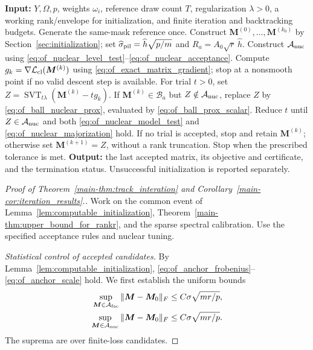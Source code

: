 \documentclass[numsec,webpdf,modern,large,namedate]{oup-authoring-template}
\theoremstyle{plain}
\theoremstyle{remark}
\newcommand{\M}{\bm{M}}
\newif\ifmarkchanges
\newenvironment{revision}{\begingroup\ifmarkchanges\color{red}\fi}{\endgroup}
\DeclareRobustCommand{\revisionfloatcolor}{\ifmarkchanges\color{red}\fi}
\begin{document}
\begin{revision}
\begin{algorithm}[!ht]\revisionfloatcolor{}
\caption{Nuclear-norm regularized residual spectral matching}
\label{alg:of_nuclear}
\begin{algorithmic}[1]
\State \textbf{Input:} $Y,\Omega,p$, weights $\omega_i$, reference draw count $T$,
regularization $\lambda>0$, a working rank/envelope for initialization, and
finite iteration and backtracking budgets.
\State Generate the same-mask reference once. Construct
$\M^{(0)},\ldots,\M^{(k_0)}$ by Section~\ref{sec:initialization}; set
$\widehat\sigma_{\rm pil}=\widehat h\sqrt{p/m}$ and
$R_a=A_0\sqrt r\,\widehat h$.
\State Construct $\mathcal A_{\rm nuc}$ using
\eqref{eq:of_nuclear_level_test}--\eqref{eq:of_nuclear_acceptance}.
\State Compute $g_k=\nabla\mathcal L_{\rm cl}(\M^{(k)})$ using \eqref{eq:of_exact_matrix_gradient}; stop at a nonsmooth point if no valid descent step is available.
\State For trial $t>0$, set
$Z=\operatorname{SVT}_{t\lambda}(\M^{(k)}-tg_k)$.
\State If $\M^{(k)}\in\mathcal B_a$ but $Z\notin\mathcal A_{\rm nuc}$,
replace $Z$ by \eqref{eq:of_ball_nuclear_prox}, evaluated by \eqref{eq:of_ball_prox_scalar}.
\State Reduce $t$ until $Z\in\mathcal A_{\rm nuc}$ and both
\eqref{eq:of_nuclear_model_test} and \eqref{eq:of_nuclear_majorization} hold.
\State If no trial is accepted, stop and retain $\M^{(k)}$;
otherwise set $\M^{(k+1)}=Z$, without a rank truncation.
\State Stop when the prescribed tolerance is met.
\EndFor
\State \textbf{Output:} the last accepted matrix, its objective and certificate,
and the termination status.  Unsuccessful initialization is reported separately.
\end{algorithmic}
\end{algorithm}

\begin{proof}[Proof of Theorem~\ref{main-thm:track_interation} and Corollary~\ref{main-cor:iteration_results}.]
Work on the common event of Lemma~\ref{lem:computable_initialization},
Theorem~\ref{main-thm:upper_bound_for_rankr}, and the sparse spectral calibration.
Use the specified acceptance rules and nuclear tuning.

\textit{Statistical control of accepted candidates.} By Lemma~\ref{lem:computable_initialization}, \eqref{eq:of_anchor_frobenius}--\eqref{eq:of_anchor_scale} hold.
We first establish the uniform bounds
\begin{align}
 \sup_{\M\in\mathcal A_{\rm fac}}\|\M-\M_0\|_F
       &\le C\sigma\sqrt{mr/p},\label{eq:of_factor_rate}\\
 \sup_{\M\in\mathcal A_{\rm nuc}}\|\M-\M_0\|_F
       &\le C\sigma\sqrt{mr/p}.\label{eq:of_nuclear_rate}
\end{align}
The suprema are over finite-loss candidates.


\end{proof}
\end{revision}
\end{document}
